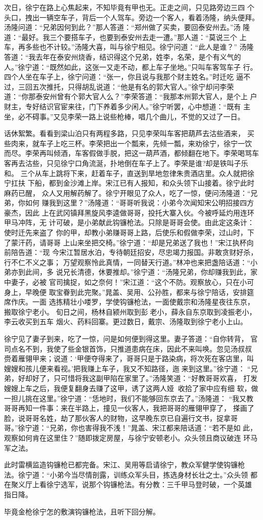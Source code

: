 次日，徐宁在路上心焦起来，不知毕竟有甲也无。正走之间，只见路旁边三四
个头口，拽出一辆空车子，背后一个人驾车。旁边一个客人，看着汤隆，纳头便拜。
汤隆问道：“兄弟因何到此？”那人答道：“郑州做了买卖，要回泰安州去。”汤
隆道：“最好。我三个要搭车子，也要到泰安州去走一遭。”那人道：“莫说三个
上车，再多些也不计较。”汤隆大喜，叫与徐宁相见。徐宁问道：“此人是谁？”
汤隆答道：“我去年在泰安州烧香，结识得这个兄弟，姓李，名荣，是个有义气的
人。”徐宁道：“既然如此，这张一又走不动，都上车子坐地。”只叫车客驾车子
行。四个人坐在车子上，徐宁问道：“张一，你且说与我那个财主姓名。”时迁吃
逼不过，三回五次推托，只得胡乱说道：“他是有名的郭大官人。”徐宁却问李荣
道：“你那泰安州曾有个郭大官人么？”李荣答道：“我那本州郭大官人，是个上
户财主，专好结识官宦来往，门下养着多少闲人。”徐宁听罢，心中想道：“既有
主坐，必不碍事。”又见李荣一路上说些枪棒，唱几个曲儿，不觉的又过了一日。

话休絮繁。看看到梁山泊只有两程多路，只见李荣叫车客把葫芦去沽些酒来，
买些肉来，就车子上吃三杯。李荣把出一个瓢来，先倾一瓢，来劝徐宁，徐宁一饮
而尽。李荣再叫倾酒，车客假做手脱，把这一葫芦酒，都倾翻在地下。李荣喝骂车
客再去沽些，只见徐宁口角流涎，扑地倒在车子上了。李荣是谁?却是铁叫子乐和。
三个从车上跳将下来，赶着车子，直送到旱地忽律朱贵酒店里。众人就把徐宁扛扶
下船，都到金沙滩上岸。宋江已有人报知，和众头领下山接着。徐宁此时麻药已醒，
众人又用解药解了。徐宁开眼见了众人，吃了一惊，便问汤隆道：“兄弟，你如何
赚我到这里？”汤隆道：“哥哥听我说：小弟今次闻知宋公明招接四方豪杰，因此
上在武冈镇拜黑旋风李逵做哥哥，投托大寨入伙。今被呼延灼用连环甲马冲阵，无
计可破，是小弟献此钩镰枪法。只除是哥哥会使。由此定这条计：使时迁先来盗了
你的甲，却教小弟赚哥哥上路，后使乐和假做李荣，过山时，下了蒙汗药，请哥哥
上山来坐把交椅。”徐宁道：“却是兄弟送了我也！”宋江执杯向前陪告道：“现
今宋江暂居水泊，专待朝廷招安，尽忠竭力报国。非敢贪财好杀，行不仁不义之事；
万望观察怜此真情，一同替天行道。”林冲也来把盏陪话道：“小弟亦到此间，多
说兄长清德，休要推却。”徐宁道：“汤隆兄弟，你却赚我到此，家中妻子，必被
官司擒捉，如之奈何！”宋江道：“这个不防。观察放心，只在小可身上，早晚便
取宝眷到此完聚。”晁盖、吴用、公孙胜，都来与徐宁陪话，安排筵席作庆。一面
选拣精壮小喽罗，学使钩镰枪法，一面使戴宗和汤隆星夜往东京，搬取徐宁老小。
旬日之间，杨林自颍州取到彭老小，薛永自东京取到凌振老小，李云收买到五车
烟火、药料回寨。更过数日，戴宗、汤隆取到徐宁老小上山。

徐宁见了妻子到来，吃了一惊，问是如何便到得这里。妻子答道：“自你转背，
官司点名不到，我使了些金银首饰，只推道患病在床，因此不来叫唤。忽见汤叔叔
赍着雁翎甲来；说道：‘甲便夺得来了，哥哥只是于路染病，将次死在客店里，叫
嫂嫂和孩儿便来看视。’把我赚上车子，我又不知路径，迤来到这里。”徐宁道：
“兄弟，好却好了，只可惜将我这副甲陷在家里了。”汤隆笑道：“好教哥哥欢喜，
打发嫂嫂上车之后，我便复翻身去赚了这甲，诱了这两人娅，收拾了家中应有细
软，做一担儿挑在这里。”徐宁道：“恁地时，我们不能够回东京去了。”汤隆道：
“我又教哥哥再知一件事：来在半路上，撞见一伙客人，我把哥哥的雁翎甲穿了，
搽画了脸，说哥哥名姓，劫了那伙客人的财物，这早晚东京已自遍行文书，捉拿哥
哥。”徐宁道：“兄弟，你也害得我不浅！”晁盖、宋江都来陪话道：“若不是如
此，观察如何肯在这里住？”随即拨定房屋，与徐宁安顿老小。众头领且商议破连
环马军之法。

此时雷横监造钩镰枪已都完备。宋江、吴用等启请徐宁，教众军健学使钩镰枪
法。徐宁道：“小弟今当尽情剖露，训练众军头目，拣选身材长壮之士。”众头领
都在聚义厅上看徐宁选军，说那个钩镰枪法。有分教：三千甲马登时破，一个英雄
指日降。

毕竟金枪徐宁怎的敷演钩镰枪法，且听下回分解。